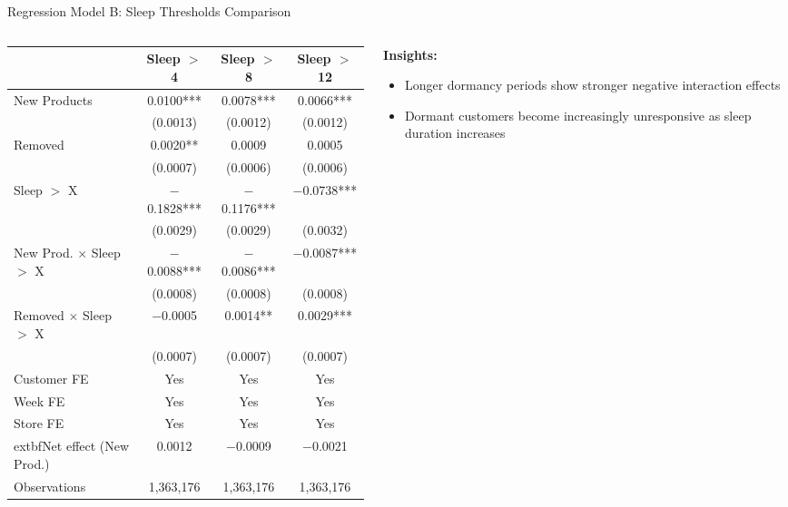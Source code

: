 \documentclass[aspectratio=169]{beamer}  %
\begin{document}
\begin{frame}{Regression Model B: Sleep Thresholds Comparison}
\vspace{-0.2cm}
\begin{columns}
\begin{column}{0.7\linewidth}
    \begin{table}[h]
    \centering
    \scriptsize
    \begin{tabular}{lccc}
    \toprule
     & \textbf{Sleep $>$ 4} & \textbf{Sleep $>$ 8} & \textbf{Sleep $>$ 12} \\
    \midrule
    New Products & 0.0100*** & 0.0078*** & 0.0066*** \\
     & (0.0013) & (0.0012) & (0.0012) \\
    Removed & 0.0020** & 0.0009 & 0.0005 \\
     & (0.0007) & (0.0006) & (0.0006) \\
    Sleep $>$ X & $-$0.1828*** & $-$0.1176*** & $-$0.0738*** \\
     & (0.0029) & (0.0029) & (0.0032) \\
    New Prod. $\times$ Sleep $>$ X & $-$0.0088*** & $-$0.0086*** & $-$0.0087*** \\
     & (0.0008) & (0.0008) & (0.0008) \\
    Removed $\times$ Sleep $>$ X & $-$0.0005 & 0.0014** & 0.0029*** \\
     & (0.0007) & (0.0007) & (0.0007) \\
    \midrule
    Customer FE & Yes & Yes & Yes \\
    Week FE & Yes & Yes & Yes \\
    Store FE & Yes & Yes & Yes \\
    \midrule
    	extbf{Net effect (New Prod.)} & 0.0012 & $-$0.0009 & $-$0.0021 \\
    Observations & 1,363,176 & 1,363,176 & 1,363,176 \\
    \bottomrule
    \end{tabular}
    \end{table}
\end{column}
\begin{column}{0.28\linewidth}
    \textbf{Insights:}
    \begin{itemize}
        \item Longer dormancy periods show stronger negative interaction effects
        \item Dormant customers become increasingly unresponsive as sleep duration increases
    \end{itemize}
\end{column}
\end{columns}    
    
\end{frame}
\end{document}
